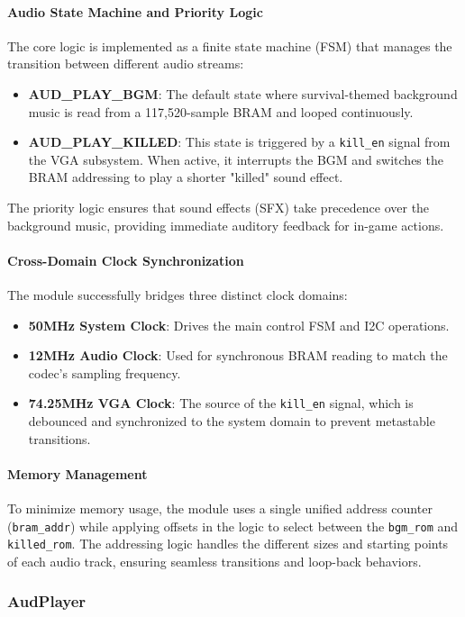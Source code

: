 \documentclass[12pt,a4paper]{article}
\begin{document}
\paragraph{Audio State Machine and Priority Logic}
The core logic is implemented as a finite state machine (FSM) that manages the transition between different audio streams:
\begin{itemize}
    \item \textbf{AUD\_PLAY\_BGM}: The default state where survival-themed background music is read from a 117,520-sample BRAM and looped continuously.
    \item \textbf{AUD\_PLAY\_KILLED}: This state is triggered by a \texttt{kill\_en} signal from the VGA subsystem. When active, it interrupts the BGM and switches the BRAM addressing to play a shorter "killed" sound effect.
\end{itemize}
The priority logic ensures that sound effects (SFX) take precedence over the background music, providing immediate auditory feedback for in-game actions.

\paragraph{Cross-Domain Clock Synchronization}
The module successfully bridges three distinct clock domains:
\begin{itemize}
    \item \textbf{50MHz System Clock}: Drives the main control FSM and I2C operations.
    \item \textbf{12MHz Audio Clock}: Used for synchronous BRAM reading to match the codec's sampling frequency.
    \item \textbf{74.25MHz VGA Clock}: The source of the \texttt{kill\_en} signal, which is debounced and synchronized to the system domain to prevent metastable transitions.
\end{itemize}

\paragraph{Memory Management}
To minimize memory usage, the module uses a single unified address counter (\texttt{bram\_addr}) while applying offsets in the logic to select between the \texttt{bgm\_rom} and \texttt{killed\_rom}. The addressing logic handles the different sizes and starting points of each audio track, ensuring seamless transitions and loop-back behaviors.

\subsubsection{AudPlayer}
\end{document}
